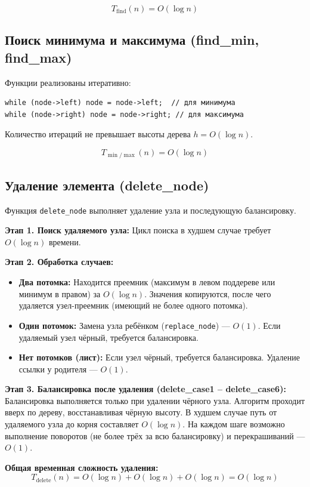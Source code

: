 \documentclass[otchet]{SCWorks}
\begin{document}
\[
T_{\text{find}}(n) = O(\log n)
\]

\subsection*{Поиск минимума и максимума (find\_min, find\_max)}

Функции реализованы итеративно:
\begin{verbatim}
while (node->left) node = node->left;  // для минимума
while (node->right) node = node->right; // для максимума
\end{verbatim}
Количество итераций не превышает высоты дерева \(h = O(\log n)\).

\[
T_{\min/\max}(n) = O(\log n)
\]

\subsection*{Удаление элемента (delete\_node)}

Функция \texttt{delete\_node} выполняет удаление узла и последующую балансировку.

\textbf{Этап 1. Поиск удаляемого узла:}
Цикл поиска в худшем случае требует \(O(\log n)\) времени.

\textbf{Этап 2. Обработка случаев:}
\begin{itemize}
    \item \textbf{Два потомка:} Находится преемник (максимум в левом поддереве или минимум в правом) за \(O(\log n)\). Значения копируются, после чего удаляется узел-преемник (имеющий не более одного потомка).
    \item \textbf{Один потомок:} Замена узла ребёнком (\texttt{replace\_node}) — \(O(1)\). Если удаляемый узел чёрный, требуется балансировка.
    \item \textbf{Нет потомков (лист):} Если узел чёрный, требуется балансировка. Удаление ссылки у родителя — \(O(1)\).
\end{itemize}

\textbf{Этап 3. Балансировка после удаления (delete\_case1 – delete\_case6):}
Балансировка выполняется только при удалении чёрного узла. Алгоритм проходит вверх по дереву, восстанавливая чёрную высоту. В худшем случае путь от удаляемого узла до корня составляет \(O(\log n)\). На каждом шаге возможно выполнение поворотов (не более трёх за всю балансировку) и перекрашиваний — \(O(1)\).

\textbf{Общая временная сложность удаления:}
\[
T_{\text{delete}}(n) = O(\log n) + O(\log n) + O(\log n) = O(\log n)
\]
\end{document}
